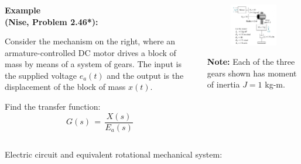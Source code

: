 \documentclass[ 10pt, xcolor = dvipsnames]{beamer}
\begin{document}
\begin{frame}[allowframebreaks]
\frametitle{\insertsection}

\begin{columns}

\begin{column}{0.45\textwidth}
\textbf{Example \\ (Nise, Problem 2.46*):}
\halfskip

Consider the mechanism on the right, where an armature-controlled DC motor drives a block of mass by means of a system of gears. The input is the supplied voltage $e_a(t)$ and the output is the displacement of the block of mass $x(t)$. 
\halfskip

Find the transfer function:
\[
G(s) \, = \, \frac{X(s)}{E_a(s)}
\]

\end{column}

\begin{column}{0.45\textwidth}
\begin{figure}[htb]
\centering
\includegraphics[width=\columnwidth]{figures/nise_prob-2-46.jpeg}
\end{figure}
\fullskip
{
\small
\textbf{Note:} Each of the three gears shown has moment of inertia $J = 1$ kg-m. 
}

\end{column}

\end{columns}
\framebreak

Electric circuit and equivalent rotational mechanical system: 
\begin{figure}[htb]
\centering
\def\svgwidth{0.9\columnwidth}

\end{figure}

\end{frame}
\end{document}
